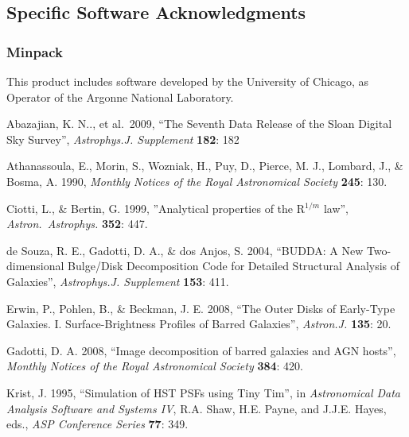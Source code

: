 \documentclass[10pt]{article}
\begin{document}
\subsection{Specific Software Acknowledgments}

\subsubsection{Minpack}
This product includes software developed by the University of Chicago, as Operator of
the Argonne National Laboratory.





\begin{thebibliography}{}


 Abazajian, K. N.., et al.\ 2009, ``The Seventh 
Data Release of the Sloan Digital Sky Survey'', \textit{Astrophys.J. Supplement} \textbf{182}: 182

 Athanassoula, E., Morin, S., Wozniak, H.,
Puy, D., Pierce, M. J., Lombard, J., \& Bosma, A. 1990, \textit{Monthly Notices of the Royal
Astronomical Society} \textbf{245}: 130.

 Ciotti, L., \& Bertin, G. 1999,
''Analytical properties of the R$^{1/m}$ law'', \textit{Astron.\ Astrophys.}
\textbf{352}: 447.

 de Souza, R. E.,
Gadotti, D. A., \& dos Anjos, S. 2004, ``BUDDA: A New Two-dimensional Bulge/Disk
Decomposition Code for Detailed Structural Analysis of Galaxies'',
\textit{Astrophys.J. Supplement} \textbf{153}: 411.

 Erwin, P.,
Pohlen, B., \& Beckman, J. E. 2008, ``The Outer Disks of Early-Type Galaxies. I. 
Surface-Brightness Profiles of Barred Galaxies'', \textit{Astron.J.} \textbf{135}: 20.

 Gadotti, D. A. 2008, ``Image decomposition of barred galaxies and AGN hosts'',
\textit{Monthly Notices of the Royal
Astronomical Society} \textbf{384}: 420.

 Krist, J. 1995, ``Simulation of HST PSFs using Tiny Tim'', 
in \textit{Astronomical Data Analysis Software and Systems IV}, 
R.A. Shaw, H.E. Payne, and J.J.E. Hayes, eds., \textit{ASP Conference Series} \textbf{77}: 349.


\end{thebibliography}
\end{document}
